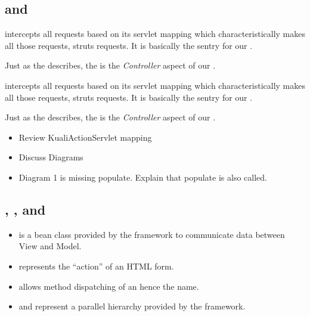 \begin{ifhtml}
  \begin{s5slide}
    \section{ and \\ }
     intercepts all requests based on its servlet mapping which characteristically makes all those
    requests, struts requests. It is basically the sentry for our \MVC .

    Just as the  describes, the  is the \emph{Controller} aspect of our
    \MVC .
    \begin{slideshow}
      \item {}
      \item {}
    \end{slideshow}
    \begin{s5notes}
       intercepts all requests based on its servlet mapping which characteristically makes all those
      requests, struts requests. It is basically the sentry for our \MVC .
      
      Just as the  describes, the  is the \emph{Controller} aspect of our
      \MVC .

      \begin{itemize}
        \item Review KualiActionServlet mapping
        \item Discuss Diagrams
        \item Diagram 1 is missing populate. Explain that populate is also called.
      \end{itemize}
    \end{s5notes}
  \end{s5slide}

  \begin{s5slide}
    \section{, , and }

    \begin{itemize}
      \item {} is a bean class provided by the framework to communicate data between View and Model.
      \item {} represents the ``action'' of an HTML form.
      \item {} allows method dispatching of an  hence the name.
      \item {} and  represent a parallel hierarchy provided by the framework.
    \end{itemize}


\end{s5slide}
\end{ifhtml}
